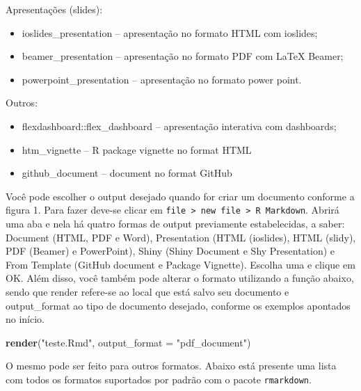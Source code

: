 \documentclass[
]{book}
\newenvironment{Shaded}{\begin{snugshade}}{\end{snugshade}}
\newcommand{\DataTypeTok}[1]{\textcolor[rgb]{0.13,0.29,0.53}{#1}}
\newcommand{\KeywordTok}[1]{\textcolor[rgb]{0.13,0.29,0.53}{\textbf{#1}}}
\newcommand{\NormalTok}[1]{#1}
\newcommand{\StringTok}[1]{\textcolor[rgb]{0.31,0.60,0.02}{#1}}
\providecommand{\tightlist}{%
  \setlength{\itemsep}{0pt}\setlength{\parskip}{0pt}}
\begin{document}
Apresentações (slides):

\begin{itemize}
\tightlist
\item
  ioslides\_presentation -- apresentação no formato HTML com ioslides;
\item
  beamer\_presentation -- apresentação no formato PDF com LaTeX Beamer;
\item
  powerpoint\_presentation -- apresentação no formato power point.
\end{itemize}

Outros:

\begin{itemize}
\tightlist
\item
  flexdashboard::flex\_dashboard -- apresentação interativa com dashboards;
\item
  htm\_vignette -- R package vignette no format HTML
\item
  github\_document -- document no format GitHub
\end{itemize}

Você pode escolher o output desejado quando for criar um documento conforme a figura 1. Para fazer deve-se clicar em \texttt{file\ \textgreater{}\ new\ file\ \textgreater{}\ R\ Markdown}. Abrirá uma aba e nela há quatro formas de output previamente estabelecidas, a saber: Document (HTML, PDF e Word), Presentation (HTML (ioslides), HTML (slidy), PDF (Beamer) e PowerPoint), Shiny (Shiny Document e Shy Presentation) e From Template (GitHub document e Package Vignette). Escolha uma e clique em OK.
Além disso, você também pode alterar o formato utilizando a função abaixo, sendo que render refere-se ao local que está salvo seu documento e output\_format ao tipo de documento desejado, conforme os exemplos apontados no início.

\begin{Shaded}
\begin{Highlighting}[]
\KeywordTok{render}\NormalTok{(}\StringTok{"teste.Rmd"}\NormalTok{, }\DataTypeTok{output\_format =} \StringTok{"pdf\_document"}\NormalTok{)}
\end{Highlighting}
\end{Shaded}

O mesmo pode ser feito para outros formatos.
Abaixo está presente uma lista com todos os formatos suportados por padrão com o pacote \texttt{rmarkdown}.
\end{document}
